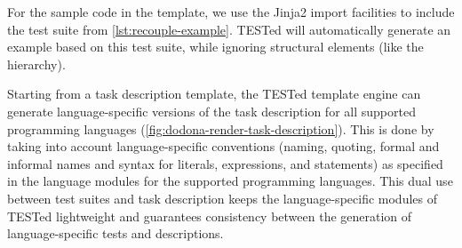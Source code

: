 \documentclass[../main]{subfiles}
\begin{document}
For the sample code in the template, we use the Jinja2 import facilities to include the test suite from \cref{lst:recouple-example}.
TESTed will automatically generate an example based on this test suite, while ignoring structural elements (like the hierarchy).

Starting from a task description template, the TESTed template engine can generate language-specific versions of the task description for all supported programming languages (\cref{fig:dodona-render-task-description}).
This is done by taking into account language-specific conventions (naming, quoting, formal and informal names and syntax for literals, expressions, and statements) as specified in the language modules for the supported programming languages.
This dual use between test suites and task description keeps the language-specific modules of TESTed lightweight and guarantees consistency between the generation of language-specific tests and descriptions.
\end{document}
